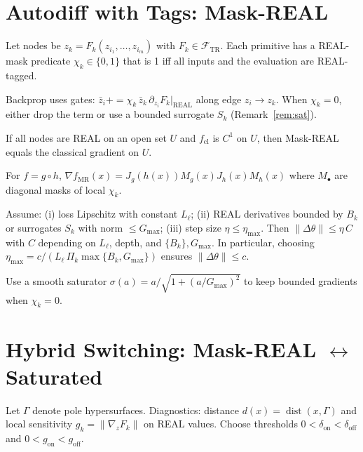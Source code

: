 \documentclass[twoside,11pt]{article}
\begin{document}
\section*{Autodiff with Tags: Mask-REAL}
\label{sec:autodiff}
Let nodes be \(z_k=F_k(z_{i_1},\dots,z_{i_m})\) with \(F_k\in\mathcal{F}_{\!\mathrm{TR}}\). Each primitive has a REAL-mask predicate \(\chi_k\in\{0,1\}\) that is 1 iff all inputs and the evaluation are REAL-tagged.
\begin{definition}\label{def:mask-real}
Backprop uses gates: $\bar z_i {+}{=} \chi_k\,\bar z_k\,\partial_{z_i}F_k\vert_{\mathrm{REAL}}$ along edge $z_i\to z_k$. When $\chi_k=0$, either drop the term or use a bounded surrogate $S_k$ (Remark~\ref{rem:sat}).
\end{definition}
\begin{lemma}\label{lem:real}
If all nodes are REAL on an open set $U$ and $f_{\mathrm{cl}}$ is $C^1$ on $U$, then Mask-REAL equals the classical gradient on $U$.
\end{lemma}
\begin{lemma}\label{lem:chain}
For $f=g\circ h$, $\nabla f_{\mathrm{MR}}(x)=J_g(h(x))M_g(x)J_h(x)M_h(x)$ where $M_\bullet$ are diagonal masks of local $\chi_k$.
\end{lemma}
\begin{proposition}\label{prop:bounded-update}
Assume: (i) loss Lipschitz with constant $L_\ell$; (ii) REAL derivatives bounded by $B_k$ or surrogates $S_k$ with norm $\le G_{\max}$; (iii) step size $\eta\le\eta_{\max}$. Then $\|\Delta\theta\|\le \eta\,C$ with $C$ depending on $L_\ell$, depth, and $\{B_k\},G_{\max}$. In particular, choosing $\eta_{\max}=c/(L_\ell\,\Pi_k\max\{B_k,G_{\max}\})$ ensures $\|\Delta\theta\|\le c$.
\end{proposition}
\begin{remark}[Saturation]\label{rem:sat}
Use a smooth saturator $\sigma(a)=a/\sqrt{1+(a/G_{\max})^2}$ to keep bounded gradients when $\chi_k=0$.
\end{remark}

\section*{Hybrid Switching: Mask-REAL $\leftrightarrow$ Saturated}
\label{sec:hybrid}
Let $\Gamma$ denote pole hypersurfaces. Diagnostics: distance $d(x)=\operatorname{dist}(x,\Gamma)$ and local sensitivity $g_k=\|\nabla_z F_k\|$ on REAL values. Choose thresholds $0<\delta_{\mathrm{on}}<\delta_{\mathrm{off}}$ and $0<g_{\mathrm{on}}<g_{\mathrm{off}}$.
\end{document}
